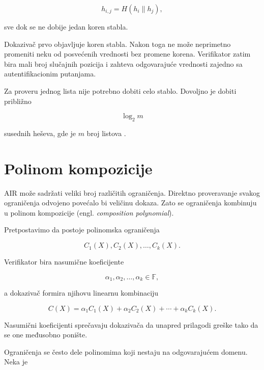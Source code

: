 \begin{equation}
    h_{i,j} = H\left(h_i \parallel h_j\right),
\end{equation}

sve dok se ne dobije jedan koren stabla.

Dokazivač prvo objavljuje koren stabla. Nakon toga ne može neprimetno promeniti
neku od posvećenih vrednosti bez promene korena. Verifikator zatim bira mali broj
slučajnih pozicija i zahteva odgovarajuće vrednosti zajedno sa autentifikacionim
putanjama.

Za proveru jednog lista nije potrebno dobiti celo stablo. Dovoljno je dobiti
približno

\begin{equation}
    \log_2 m
\end{equation}

susednih heševa, gde je \(m\) broj listova \cite{ethstark2023}.

\section{Polinom kompozicije}

AIR može sadržati veliki broj različitih ograničenja. Direktno proveravanje svakog
ograničenja odvojeno povećalo bi veličinu dokaza. Zato se ograničenja kombinuju
u polinom kompozicije (engl. \textit{composition polynomial}).

Pretpostavimo da postoje polinomska ograničenja

\begin{equation}
    C_1(X),C_2(X),\ldots,C_k(X).
\end{equation}

Verifikator bira nasumične koeficijente

\begin{equation}
    \alpha_1,\alpha_2,\ldots,\alpha_k \in \mathbb{F},
\end{equation}

a dokazivač formira njihovu linearnu kombinaciju

\begin{equation}
    C(X) = \alpha_1 C_1(X)+\alpha_2 C_2(X)+\cdots+\alpha_k C_k(X).
\end{equation}

Nasumični koeficijenti sprečavaju dokazivača da unapred prilagodi greške tako
da se one međusobno ponište.

Ograničenja se često dele polinomima koji nestaju na odgovarajućem domenu.
Neka je

